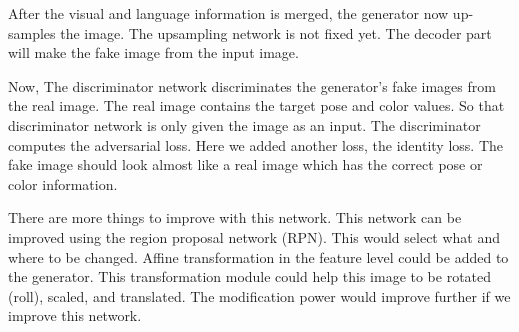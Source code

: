 \documentclass[10pt,twocolumn,letterpaper]{article}
\begin{document}
After the visual and language information is merged, the generator now up-samples the image. The upsampling network is not fixed yet. The decoder part will make the fake image from the input image.

 Now, The discriminator network discriminates the generator's fake images from the real image. The real image contains the target pose and color values. So that discriminator network is only given the image as an input. The discriminator computes the adversarial loss. Here we added another loss, the identity loss. The fake image should look almost like a real image which has the correct pose or color information. 

There are more things to improve with this network. This network can be improved using the region proposal network (RPN). This would select what and where to be changed. Affine transformation in the feature level could be added to the generator. This transformation module could help this image to be rotated (roll), scaled, and translated. The modification power would improve further if we improve this network.


{\small


}
\end{document}
